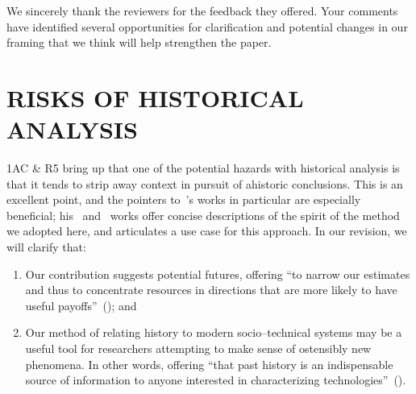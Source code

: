 \documentclass[11pt]{article}
\begin{document}
We sincerely thank the reviewers for the feedback they offered. Your comments have identified several opportunities for clarification and potential changes in our framing that we think will help strengthen the paper.

\section*{RISKS OF HISTORICAL ANALYSIS}
1AC \& R5 bring up that one of the potential hazards with
historical analysis is that
it tends to strip away context in pursuit of ahistoric conclusions.
This is an excellent point, and
the pointers to~\citeauthor{rosenberg1994exploring}'s works
in particular are especially beneficial;
his~\citeyear{rosenberg1982inside} and~\citeyear{rosenberg1994exploring} works
offer concise descriptions of the spirit of the method we adopted here,
and articulates a use case for this approach.
In our revision, we will clarify that:
\begin{enumerate}
  \item Our contribution %
  suggests potential futures, offering
            ``to narrow our estimates
              and thus to concentrate resources
              in directions that are more likely to have useful payoffs''~(\cite{rosenberg1994exploring});
  and
  \item Our method of relating history to modern socio--technical systems may be
        a useful tool for researchers attempting
        to make sense of ostensibly new phenomena.
        In other words, offering ``that past history is an indispensable source of information
                          to anyone interested in characterizing technologies''~(\cite{rosenberg1982inside}).
\end{enumerate}



\end{document}
